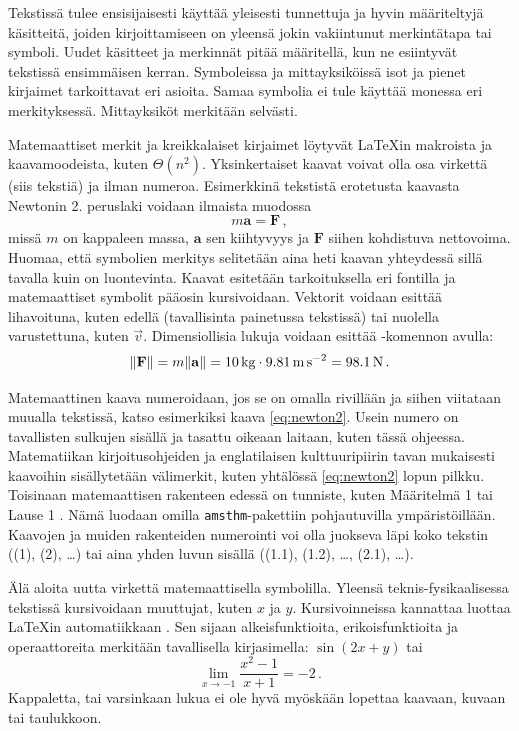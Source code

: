 Tekstissä tulee ensisijaisesti käyttää yleisesti tunnettuja ja hyvin määriteltyjä käsitteitä, joiden kirjoittamiseen on yleensä jokin vakiintunut merkintätapa tai symboli. Uudet käsitteet ja merkinnät pitää määritellä, kun ne esiintyvät tekstissä ensimmäisen kerran. Symboleissa ja mittayksiköissä isot ja pienet kirjaimet tarkoittavat eri asioita. Samaa symbolia ei tule käyttää monessa eri merkityksessä. Mittayksiköt merkitään selvästi.

Matemaattiset merkit ja kreikkalaiset kirjaimet löytyvät \LaTeX{}in makroista ja kaavamoodeista, kuten \(\Theta(n^2)\). Yksinkertaiset kaavat voivat olla osa virkettä (siis tekstiä) ja ilman numeroa. Esimerkkinä tekstistä erotetusta kaavasta Newtonin 2. peruslaki voidaan ilmaista muodossa
\begin{equation}\label{eq:newton2}
    m\mathbf{a} = \mathbf{F} \,,
\end{equation}
missä \(m\) on kappaleen massa, \(\mathbf{a}\) sen kiihtyvyys ja \(\mathbf{F}\) siihen kohdistuva nettovoima. Huomaa, että symbolien merkitys selitetään aina heti kaavan yhteydessä sillä tavalla kuin on luontevinta. Kaavat esitetään tarkoituksella eri fontilla ja matemaattiset symbolit pääosin kursivoidaan. Vektorit voidaan esittää lihavoituna, kuten edellä (tavallisinta painetussa tekstissä) tai nuolella varustettuna, kuten \(\vec{v}\). Dimensiollisia lukuja voidaan esittää -komennon avulla:
\begin{equation*}
    \lVert\mathbf{F}\rVert
    =
    m\lVert\mathbf{a}\rVert
    =
    \SI{10}{\kilogram} \cdot \SI{9.81}{\metre\per\second\squared}
    =
    \SI{98.1}{\newton} \,.
\end{equation*}

Matemaattinen kaava numeroidaan, jos se on omalla rivillään ja siihen viitataan muualla tekstissä, katso esimerkiksi kaava \eqref{eq:newton2}. Usein numero on tavallisten sulkujen sisällä ja tasattu oikeaan laitaan, kuten tässä ohjeessa. Matematiikan kirjoitusohjeiden ja englatilaisen kulttuuripiirin tavan mukaisesti kaavoihin sisällytetään välimerkit, kuten yhtälössä \eqref{eq:newton2} lopun pilkku. Toisinaan matemaattisen rakenteen edessä on tunniste, kuten Määritelmä 1 tai Lause 1 \parencite{matohje2009}. Nämä luodaan omilla \texttt{amsthm}-pakettiin pohjautuvilla ympäristöillään. Kaavojen ja muiden rakenteiden numerointi voi olla juokseva läpi koko tekstin ((1), (2), \ldots) tai aina yhden luvun sisällä ((1.1), (1.2), \ldots, (2.1), \ldots).

Älä aloita uutta virkettä matemaattisella symbolilla. Yleensä teknis-fysikaalisessa tekstissä kursivoidaan muuttujat, kuten \(x\) ja \(y\). Kursivoinneissa kannattaa luottaa \LaTeX{}in automatiikkaan \parencite{notsoshort}. Sen sijaan alkeisfunktioita, erikoisfunktioita ja operaattoreita merkitään tavallisella kirjasimella: \(\sin(2x + y)\) tai
\begin{equation*}
    \lim_{x \rightarrow -1}\frac{x^2 - 1}{x + 1} = -2 \,.
\end{equation*}
Kappaletta, tai varsinkaan lukua ei ole hyvä myöskään lopettaa kaavaan, kuvaan tai taulukkoon.

